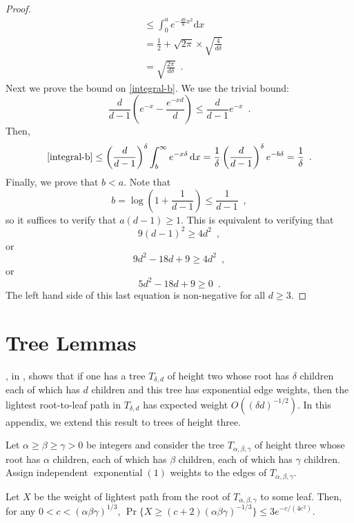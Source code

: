 \documentclass{patmorin}
\DeclareMathOperator{\exponential}{exponential}
\begin{document}
\begin{proof}
\begin{align*}
        & \le \int_0^a e^{-\frac{d\delta}{8}x^2} \mathrm{d}x \\
        & = \frac{1}{2}+\sqrt{2\pi}\times\sqrt{\frac{4}{d\delta}} \\
        & = \sqrt{\frac{2\pi}{d\delta}} \enspace .
   \end{align*}
   Next we prove the bound on \eqref{integral-b}.  We use the trivial bound:
   \[
       \frac{d}{d-1}\left(e^{-x}-\frac{e^{-xd}}{d}\right) 
         \le \frac{d}{d-1}e^{-x}
       \enspace .
   \]
   Then,
   \[
      \eqref{integral-b} \le \left(\frac{d}{d-1}\right)^\delta
       \int_b^\infty e^{-x\delta} \,\mathrm{d}x 
       = \frac{1}{\delta}\left(\frac{d}{d-1}\right)^\delta e^{-b\delta}
       = \frac{1}{\delta} \enspace .
   \]
   Finally, we prove that $b<a$.  Note that 
   \[  b=\log\left(1+\frac{1}{d-1}\right)  \le \frac{1}{d-1} \enspace , \]
   so it suffices to verify that $a(d-1)\ge 1$.  This is equivalent to verifying
   that
   \[ 9(d-1)^2 \ge 4d^2 \enspace , \]
   or
   \[ 9d^2 - 18d + 9 \ge 4d^2 \enspace , \]
   or
   \[ 5d^2 - 18d + 9 \ge 0 \enspace . \]
   The left hand side of this last equation is non-negative for all $d\ge 3$.
\end{proof}

\section{Tree Lemmas}

, in , shows that if one has a
tree $T_{\delta,d}$ of height two whose root has $\delta$ children each
of which has $d$ children and this tree has exponential edge weights,
then the lightest root-to-leaf path in $T_{\delta,d}$ has expected
weight $O((\delta d)^{-1/2})$.  In this appendix, we extend this result
to trees of height three.

Let $\alpha \ge \beta \ge \gamma > 0$ be integers and consider the
tree $T_{\alpha,\beta,\gamma}$ of height three whose root has $\alpha$
children, each of which has $\beta$ children, each of which has $\gamma$
children.  Assign independent $\exponential(1)$ weights to the edges
of $T_{\alpha,\beta,\gamma}$.

\begin{lem}
   Let $X$ be the weight of lightest path from the root of
   $T_{\alpha,\beta,\gamma}$ to some leaf.  Then, 
   for any $0<c<(\alpha\beta\gamma)^{1/3}$,  $\Pr\{X
   \ge (c+2)(\alpha\beta\gamma)^{-1/3} \} \le 3e^{-c/(4e^2)}$.
\end{lem}
\end{document}
